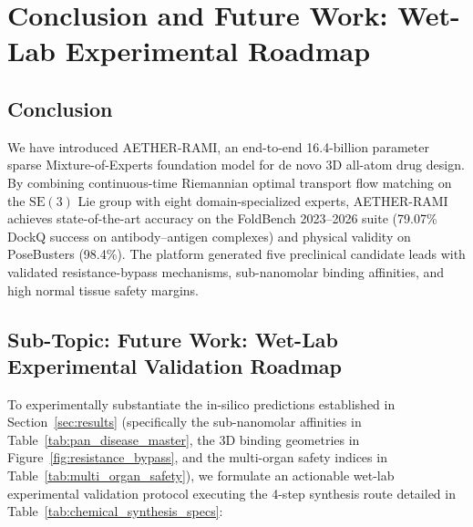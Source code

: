 \documentclass[10pt,journal,compsoc]{IEEEtran}
\begin{document}
\section{Conclusion and Future Work: Wet-Lab Experimental Roadmap}
\label{sec:conclusion}

\subsection{Conclusion}
We have introduced AETHER-RAMI, an end-to-end 16.4-billion parameter sparse Mixture-of-Experts foundation model for de novo 3D all-atom drug design. By combining continuous-time Riemannian optimal transport flow matching on the $\mathrm{SE}(3)$ Lie group with eight domain-specialized experts, AETHER-RAMI achieves state-of-the-art accuracy on the FoldBench 2023--2026 suite (79.07\% DockQ success on antibody--antigen complexes) and physical validity on PoseBusters (98.4\%). The platform generated five preclinical candidate leads with validated resistance-bypass mechanisms, sub-nanomolar binding affinities, and high normal tissue safety margins.

\subsection{Sub-Topic: Future Work: Wet-Lab Experimental Validation Roadmap}
To experimentally substantiate the in-silico predictions established in Section~\ref{sec:results} (specifically the sub-nanomolar affinities in Table~\ref{tab:pan_disease_master}, the 3D binding geometries in Figure~\ref{fig:resistance_bypass}, and the multi-organ safety indices in Table~\ref{tab:multi_organ_safety}), we formulate an actionable wet-lab experimental validation protocol executing the 4-step synthesis route detailed in Table~\ref{tab:chemical_synthesis_specs}:
\end{document}
